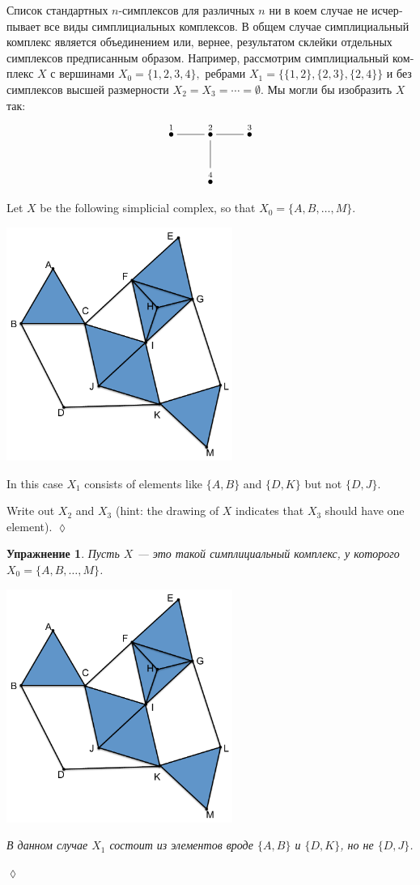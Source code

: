 \documentclass[a4paper]{book}
\newcommand{\LMO}[1]{\stackrel{#1}{\bullet}}
\theoremstyle{myth}
\newtheorem{excENG}[envENG]{\begin{english}Exercise\end{english}}
\newenvironment{exerciseENG}{\begin{excENG}}{\hspace*{\fill}$\lozenge$\end{excENG}}
\newtheorem{excRUS}[envRUS]{Упражнение}
\newenvironment{exerciseRUS}{\begin{excRUS}}{\hspace*{\fill}$\lozenge$\end{excRUS}}
\begin{document}
\begin{russian}
Список стандартных $n$-симплексов для различных $n$ ни в коем случае не исчерпывает все виды симплициальных комплексов. В общем случае симплициальный комплекс является объединением или, вернее, результатом склейки отдельных симплексов предписанным образом. Например, рассмотрим симплициальный комплекс $X$ с вершинами $X_0=\{1,2,3,4\},$ ребрами $X_1=\{\{1,2\},\{2,3\},\{2,4\}\}$ и без симплексов высшей размерности $X_2=X_3=\cdots=\emptyset$. Мы могли бы изобразить $X$ так:
$$\xymatrix{\LMO{1}\ar@{-}[r]&\LMO{2}\ar@{-}[r]\ar@{-}[d]&\LMO{3}\\&\LMO{4}}$$

\begin{exerciseENG}
Let $X$ be the following simplicial complex, so that $X_0=\{A,B,\ldots,M\}$. 
\begin{center}
\includegraphics[height=3in]{OlogNetwork5}
\end{center} 
In this case $X_1$ consists of elements like $\{A,B\}$ and $\{D,K\}$ but not $\{D,J\}$. 

Write out $X_2$ and $X_3$ (hint: the drawing of $X$ indicates that $X_3$ should have one element).
\end{exerciseENG}

\begin{exerciseRUS}
Пусть $X$ — это такой симплициальный комплекс, у которого $X_0=\{A,B,\ldots,M\}$. 
\begin{center}
\includegraphics[height=3in]{OlogNetwork5}
\end{center} 
В данном случае $X_1$ состоит из элементов вроде $\{A,B\}$ и $\{D,K\}$, но не $\{D,J\}$. 


\end{exerciseRUS}
\end{russian}
\end{document}

